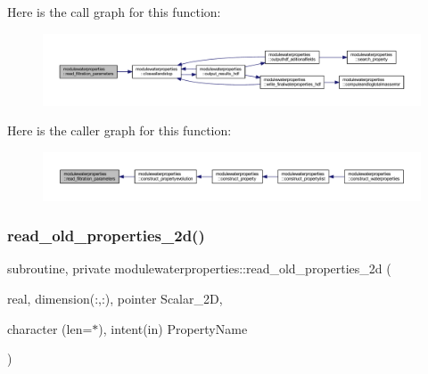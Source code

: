 Here is the call graph for this function\+:\nopagebreak
\begin{figure}[H]
\begin{center}
\leavevmode
\includegraphics[width=350pt]{namespacemodulewaterproperties_ace6684fcd5340a736f01034eee0565cd_cgraph}
\end{center}
\end{figure}
Here is the caller graph for this function\+:\nopagebreak
\begin{figure}[H]
\begin{center}
\leavevmode
\includegraphics[width=350pt]{namespacemodulewaterproperties_ace6684fcd5340a736f01034eee0565cd_icgraph}
\end{center}
\end{figure}
\mbox{\label{namespacemodulewaterproperties_a5a69094fb0cfdb28de4d2307ceeb3f84}} 
\subsubsection{\texorpdfstring{read\+\_\+old\+\_\+properties\+\_\+2d()}{read\_old\_properties\_2d()}}
{\footnotesize\ttfamily subroutine, private modulewaterproperties\+::read\+\_\+old\+\_\+properties\+\_\+2d (\begin{DoxyParamCaption}\item[{real, dimension(\+:,\+:), pointer}]{Scalar\+\_\+2D,  }\item[{character (len=$\ast$), intent(in)}]{Property\+Name }\end{DoxyParamCaption})\hspace{0.3cm}{\ttfamily [private]}}

